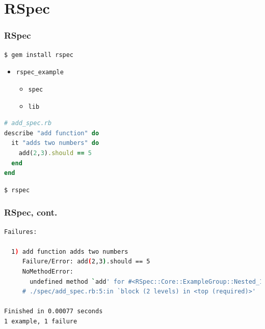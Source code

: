 \documentclass{beamer}
\begin{document}
\section{RSpec}
\begin{frame}[fragile]\frametitle{RSpec} 

  \begin{lstlisting}[language=ruby, escapechar={^}]
$ gem install rspec
  \end{lstlisting}
  \pause
  
  \begin{itemize}
    \item \texttt{rspec\_example}
    \begin{itemize}
      \item \texttt{spec}
      \item \texttt{lib}
    \end{itemize}
  \end{itemize}
  \pause 
   
  \begin{lstlisting}[language=ruby, escapechar={^}]
# add_spec.rb                                                                                                                                                                                                        
describe "add function" do
  it "adds two numbers" do
    add(2,3).should == 5
  end 
end
  \end{lstlisting}
  \pause
  
  \begin{lstlisting}[language=bash, escapechar={^}]
$ rspec
  \end{lstlisting}

\end{frame}



\begin{frame}[fragile]\frametitle{RSpec, cont.} 

  \begin{lstlisting}[language=bash, escapechar={^}]
Failures:

  1) add function adds two numbers
     Failure/Error: add(2,3).should == 5
     NoMethodError:
       undefined method `add' for #<RSpec::Core::ExampleGroup::Nested_1:0x0000000193fe30>
     # ./spec/add_spec.rb:5:in `block (2 levels) in <top (required)>'

Finished in 0.00077 seconds
1 example, 1 failure

  \end{lstlisting}

\end{frame}
\end{document}
